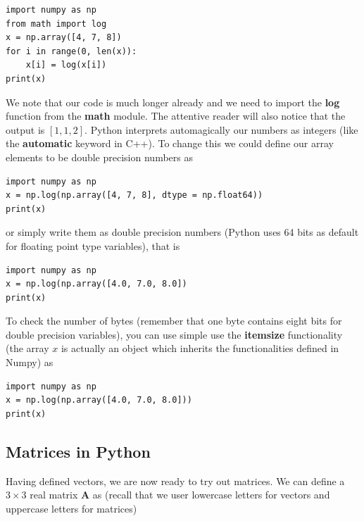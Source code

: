 \documentclass[%
oneside,                 %
final,                   %
10pt]{article}
\begin{document}
\begin{verbatim}
import numpy as np
from math import log
x = np.array([4, 7, 8])
for i in range(0, len(x)):
    x[i] = log(x[i])
print(x)
\end{verbatim}
We note that our code is much longer already and we need to import the \textbf{log} function from the \textbf{math} module. 
The attentive reader will also notice that the output is $[1, 1, 2]$. Python interprets automagically our numbers as integers (like the \textbf{automatic} keyword in C++). To change this we could define our array elements to be double precision numbers as
\begin{verbatim}
import numpy as np
x = np.log(np.array([4, 7, 8], dtype = np.float64))
print(x)
\end{verbatim}
or simply write them as double precision numbers (Python uses 64 bits as default for floating point type variables), that is
\begin{verbatim}
import numpy as np
x = np.log(np.array([4.0, 7.0, 8.0])
print(x)
\end{verbatim}
To check the number of bytes (remember that one byte contains eight bits for double precision variables), you can use simple use the \textbf{itemsize} functionality (the array $x$ is actually an object which inherits the functionalities defined in Numpy) as 
\begin{verbatim}
import numpy as np
x = np.log(np.array([4.0, 7.0, 8.0]))
print(x)
\end{verbatim}

\subsection*{Matrices in Python}

Having defined vectors, we are now ready to try out matrices. We can
define a $3 \times 3 $ real matrix $\bm{A}$ as (recall that we user
lowercase letters for vectors and uppercase letters for matrices)
\end{document}
